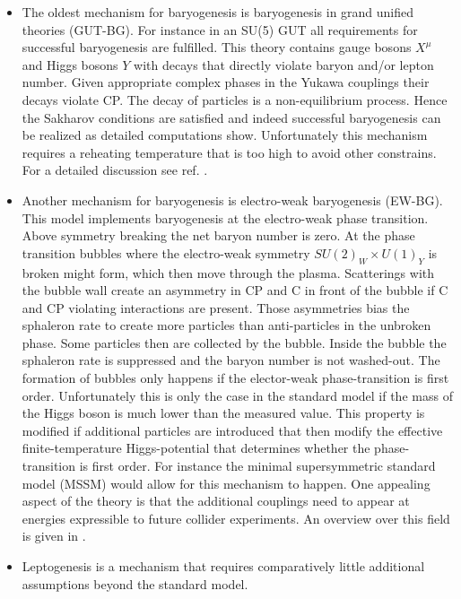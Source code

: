 \documentclass[13pt,a4paper,twoside,titlepage]{article}
\begin{document}
\begin{itemize}
    \item The oldest mechanism for baryogenesis is baryogenesis in grand unified theories (GUT-BG).
    For instance in an SU(5) GUT all requirements for successful baryogenesis are
    fulfilled. This theory contains gauge bosons $X^\mu$ and Higgs bosons $Y$ with decays that directly
    violate baryon and/or lepton number. Given appropriate complex phases in the Yukawa couplings
    their decays violate CP. The decay of particles is a non-equilibrium process. Hence the Sakharov conditions are satisfied and indeed successful baryogenesis can be realized as detailed computations show.
    Unfortunately this mechanism requires a reheating temperature that is too high to avoid other constrains. For a detailed discussion see ref. \cite[sec. 3]{Dine_2003_Bayrogenesis}.
    \item Another mechanism for baryogenesis is electro-weak baryogenesis (EW-BG).
    This model implements baryogenesis at the electro-weak phase transition.
    Above symmetry breaking the net baryon number is zero.
    At the phase transition bubbles where the electro-weak symmetry $SU(2)_W \times U(1)_Y$ is broken might form, which then
    move through the plasma.
    Scatterings with the bubble wall create an asymmetry in CP and C in front of the bubble if C and CP violating interactions are present.
    Those asymmetries bias the sphaleron rate to create more particles than anti-particles in the unbroken phase.
    Some particles then are collected by the bubble. Inside the bubble the sphaleron rate is suppressed and the
    baryon number is not washed-out.
    The formation of bubbles only happens if the elector-weak phase-transition is first order.
    Unfortunately this is only the case in the standard model if the mass of the Higgs boson is much lower than
    the measured value.
    This property is modified if additional particles are introduced that then modify the effective finite-temperature
    Higgs-potential that determines whether the phase-transition is first order.
    For instance the minimal supersymmetric standard model (MSSM) would allow for this mechanism to happen.
    One appealing aspect of the theory is that the additional couplings need to appear at energies expressible to future collider
    experiments. An overview over this field is given in \cite{Electroweak_baryogenesis_Morrissey_2012}.
    \item Leptogenesis is a mechanism that requires comparatively little additional assumptions beyond the standard model.

\end{itemize}
\end{document}
